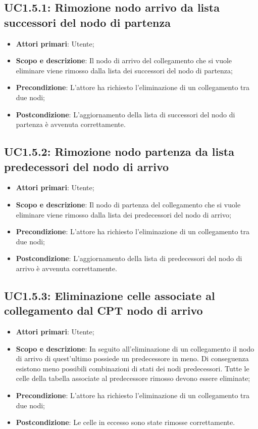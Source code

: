 \subsection{UC1.5.1: Rimozione nodo arrivo da lista successori del nodo di partenza} 
\hypertarget{UC1.5.1}{} 
\begin{itemize} 
	\item{\textbf{Attori primari}: Utente;} 
	\item{\textbf{Scopo e descrizione}: Il nodo di arrivo del collegamento che si vuole eliminare viene rimosso dalla lista dei successori del nodo di partenza;} 
	\item{\textbf{Precondizione}: L'attore ha richiesto l'eliminazione di un collegamento tra due nodi;} 
	\item{\textbf{Postcondizione}: L'aggiornamento della lista di successori del nodo di partenza è avvenuta correttamente.} 
\end{itemize} 
\subsection{UC1.5.2: Rimozione nodo partenza da lista predecessori del nodo di arrivo} 
\hypertarget{UC1.5.2}{} 
\begin{itemize} 
	\item{\textbf{Attori primari}: Utente;} 
	\item{\textbf{Scopo e descrizione}: Il nodo di partenza del collegamento che si vuole eliminare viene rimosso dalla lista dei predecessori del nodo di arrivo;} 
	\item{\textbf{Precondizione}: L'attore ha richiesto l'eliminazione di un collegamento tra due nodi;} 
	\item{\textbf{Postcondizione}: L'aggiornamento della lista di predecessori del nodo di arrivo è avvenuta correttamente.} 
\end{itemize} 
\subsection{UC1.5.3: Eliminazione celle associate al collegamento dal CPT nodo di arrivo} 
\hypertarget{UC1.5.3}{} 
\begin{itemize} 
	\item{\textbf{Attori primari}: Utente;} 
	\item{\textbf{Scopo e descrizione}: In seguito all'eliminazione di un collegamento il nodo di arrivo di quest'ultimo possiede un predecessore in meno. Di conseguenza esistono meno possibili combinazioni di stati dei nodi predecessori. Tutte le celle della tabella associate al predecessore rimosso devono essere eliminate;} 
	\item{\textbf{Precondizione}: L'attore ha richiesto l'eliminazione di un collegamento tra due nodi;} 
	\item{\textbf{Postcondizione}: Le celle in eccesso sono state rimosse correttamente.} 
\end{itemize} 
